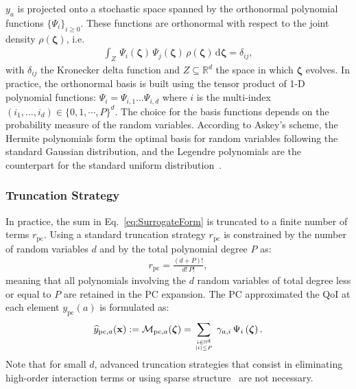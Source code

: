 $y_a$ is projected onto a stochastic space spanned by the orthonormal polynomial functions $\lbrace\Psi_{i}\rbrace_{i\geq 0}$. These functions are orthonormal with respect to the joint density $\rho(\boldsymbol{\zeta})$, i.e.
\begin{align}
\int_{Z}\,\Psi_i(\boldsymbol{\zeta})\,\Psi_j(\boldsymbol{\zeta})\,\rho(\boldsymbol{\zeta})\,\mathrm{d}\boldsymbol{\zeta} = \delta_{ij},
\label{eq:pc_innerproduct}
\end{align}
with $\delta_{ij}$ the Kronecker delta function and $Z \subseteq \mathbb{R}^d$ the space in which $\boldsymbol{\zeta}$ evolves. In practice, the orthonormal basis is built using the tensor product of 1-D polynomial functions: $\Psi_i=\Psi_{i,1}\ldots\Psi_{i,d}$ where $i$ is the multi-index $(i_1,\ldots,i_d)\in\{0,1,\cdots,P\}^d$. The choice for the basis functions depends on the probability measure of the random variables. According to Askey's scheme, the Hermite polynomials form the optimal basis for random variables following the standard Gaussian distribution, and the Legendre polynomials are the counterpart for the standard uniform distribution~\citep{xiu2002}. 

\subsubsection{Truncation Strategy}

In practice, the sum in Eq.~\eqref{eq:SurrogateForm} is truncated to a finite number of terms $r_{\text{pc}}$. Using a standard truncation strategy $r_{\text{pc}}$ is constrained by the number of random variables $d$ and by the total polynomial degree $P$ as:
\begin{align}
r_{\text{pc}} = \frac{(d + P)!}{d!\,P!},
\label{eq:pc_order}
\end{align}
meaning that all polynomials involving the $d$ random variables of total degree less or equal to $P$ are retained in the PC expansion. The PC approximated the QoI at each element $y_{\text{pc}}(a)$ is formulated as:
\begin{align}
\widehat{y}_{\text{pc},a}(\mathbf{x}) := \mathcal{M}_{\text{pc},a}(\boldsymbol{\zeta}) = \displaystyle\sum_{i\in\mathbb{N}^d\atop|i|\leq P}\,\gamma_{a,i}\,\Psi_i\left(\boldsymbol{\zeta}\right).
\label{eq:SurrogatePC}
\end{align}
Note that for small $d$, advanced truncation strategies that consist in eliminating high-order interaction terms or using sparse structure~\citep{blatman2009phd,migliorati2013} are not necessary.

